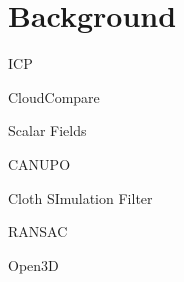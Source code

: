 \documentclass[../report.tex]{subfiles}
\begin{document}
    \section{Background}
    \label{sec:background}

\item ICP
\item CloudCompare
\item Scalar Fields
\item CANUPO
\item Cloth SImulation Filter
\item RANSAC
\item Open3D

\end{document}
